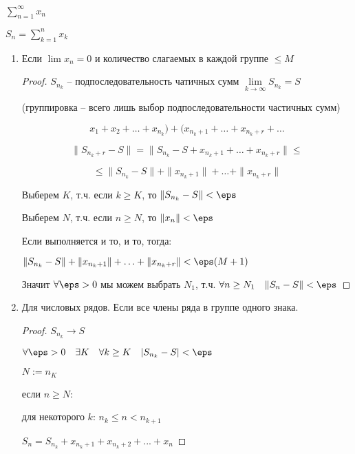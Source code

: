 \begin{theorem} \thmslashn

	$\sum\limits_{n=1}^{\infty}x_n$

	$S_n = \sum\limits_{k=1}^{n}x_k$

	\begin{enumerate}

		\item Если $\lim x_n = 0$ и количество слагаемых в каждой группе $\le M$
		
			\begin{proof} \thmslashn

				$S_{n_k}$ -- подпоследовательность чатичных сумм $\lim\limits_{k\to \infty} S_{n_k} = S$

				(группировка – всего лишь выбор подпоследовательности частичных сумм)

				\[
					x_1 + x_2 + \ldots + x_{n_k}) + (x_{n_k + 1} + \ldots + x_{n_k + r} + \ldots	
				\]

				\[
					\|S_{n_k + r} - S\| = \|S_{n_k} - S + x_{n_k + 1} + \ldots + x_{n_k + r}\| \le	
				\]

				\[
					\le \|S_{n_k} - S\| + \|x_{n_k + 1}\| + \ldots + \|x_{n_k + r}\|	
				\]

				Выберем $K$, т.ч. если $k \ge K$, то $\|S_{n_k} - S\| < \eps$

				Выберем $N$, т.ч. если $n \ge N$, то $\|x_n\| <  \eps$

				Если выполняется и то, и то, тогда:
				
				$\|S_{n_k} - S\| + \|x_{n_k + 1}\| + \ldots + \|x_{n_k + r}\| < \eps(M + 1)$

				Значит $\forall{\eps > 0}$ мы можем выбрать $N_1$, т.ч. $\forall{n \ge N_1} \quad \|S_n - S\| < \eps$
			\end{proof}
		\item Для числовых рядов. Если все члены ряда в группе одного знака.

			\begin{proof} \thmslashn
				
				$S_{n_k} \to S$

				$\forall{\eps > 0}\quad \exists{K} \quad \forall{k \ge K}\quad |S_{n_k} - S| < \eps$
		
				$N:= n_K$
		
				если $n \ge N$:
				
				для некоторого $k$: \;$n_k \le n < n_{k+1}$
		
				$S_n = S_{n_k} + x_{n_k+1} + x_{n_k+2} + ...+x_n$
		

\end{proof}
\end{enumerate}
\end{theorem}
